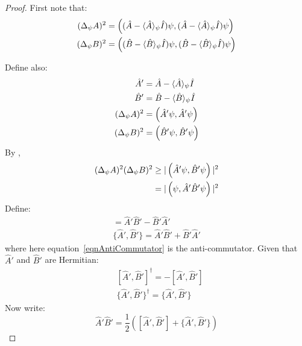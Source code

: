 \documentclass[../Main.tex]{subfiles}
\begin{document}
\begin{proof}
    First note that:
    \begin{align*}
        (\Delta_\psi A)^2 &= \left((\hat{A} - \langle \hat{A} \rangle_\psi \hat{I})\psi,(\hat{A} - \langle \hat{A} \rangle_\psi \hat{I})\psi\right) \\
        (\Delta_\psi B)^2 &= \left((\hat{B} - \langle \hat{B} \rangle_\psi \hat{I})\psi,(\hat{B} - \langle \hat{B} \rangle_\psi \hat{I})\psi\right)
    \end{align*}

    Define also:
    \begin{align*}
        \hat{A}' &= \hat{A} - \langle \hat{A} \rangle_\psi \hat{I} \\
        \hat{B}' &= \hat{B} - \langle \hat{B} \rangle_\psi \hat{I} \\
        (\Delta_\psi A)^2 &= \left(\hat{A}' \psi,\hat{A}' \psi\right) \\
        (\Delta_\psi B)^2 &= \left(\hat{B}' \psi,\hat{B}' \psi\right)
    \end{align*}
    By ,
    \begin{equation}
        \begin{split}
            (\Delta_\psi A)^2 (\Delta_\psi B)^2 &\geq |\left(\hat{A}'\psi,\hat{B}'\psi\right)|^2 \\
            &= |\left(\psi,\hat{A}'\hat{B}'\psi\right)|^2
            \label{eqnCSUncertainty}
        \end{split}
    \end{equation}
    Define:
    \begin{gather}
        [\hat{A}', \hat{B}'] = \hat{A}' \hat{B}' - \hat{B}' \hat{A}' \label{eqnCommutator} \\
        \{\hat{A}', \hat{B}'\} = \hat{A}' \hat{B}' + \hat{B}' \hat{A}' \label{eqnAntiCommutator}
    \end{gather}
    where here equation~\ref{eqnAntiCommutator} is the anti-commutator. Given that $\hat{A}'$ and $\hat{B}'$ are Hermitian:
    \begin{equation}
        \begin{split}
            &[\hat{A}', \hat{B}']^\dagger = -[\hat{A}', \hat{B}'] \\
            &\{\hat{A}', \hat{B}'\}^\dagger = \{\hat{A}', \hat{B}'\}
        \end{split}
        \label{eqnCommutatorHermitian}
    \end{equation}
    Now write:
    \begin{equation}
        \hat{A}' \hat{B}' = \frac12 \left([\hat{A}', \hat{B}'] + \{\hat{A}', \hat{B}'\}\right)

\end{equation}
\end{proof}
\end{document}
